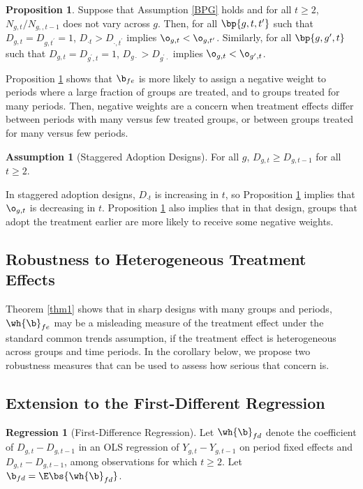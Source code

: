 \documentclass[12pt]{article}
\theoremstyle{definition}
\newtheorem{assumption}{Assumption}
\newtheorem{regression}{Regression}
\newtheorem{proposition}{Proposition}
\begin{document}
\begin{proposition}
    \label{prop1}
    Suppose that Assumption \ref{BPG} holds and for all $t \geq 2$, $N_{g,t}/N_{g,,t-1}$ does not vary across $g$. Then, for all $\bp{g, t, t^\prime}$ such that $D_{g,t} = D_{g, t^\prime} = 1$, $D_{\cdot t} > D_{\cdot, t^{\prime}}$ implies $\o_{g,t} < \o_{g, t^{\prime}}$. Similarly, for all $\bp{g, g^{\prime}, t}$ such that $D_{g,t} = D_{g^{\prime}, t} = 1$, $D_{g\cdot} > D_{g^{\prime} \cdot}$ implies $\o_{g,t} < \o_{g^{\prime}, t}$.
\end{proposition}

Proposition \ref{prop1} shows that $\b_{fe}$ is more likely to assign a negative weight to periods where a large fraction of groups are treated, and to groups treated for many periods. Then, negative weights are a concern when treatment effects differ between periods with many versus few treated groups, or between groups treated for many versus few periods. 

\begin{assumption}[Staggered Adoption Designs] \label{SAD}
    For all $g$, $D_{g,t} \geq D_{g, t-1}$ for all $t \geq 2$.
\end{assumption}

In staggered adoption designs, $D_{\cdot t}$ is increasing in $t$, so Proposition \ref{prop1} implies that $\o_{g,t}$ is decreasing in $t$. Proposition \ref{prop1} also implies that in that design, groups that adopt the treatment earlier are more likely to receive some negative weights.

\subsection{Robustness to Heterogeneous Treatment Effects}

Theorem \ref{thm1} shows that in sharp designs with many groups and periods, $\wh{\b}_{fe}$ may be a misleading measure of the treatment effect under the standard common trends assumption, if the treatment effect is heterogeneous across groups and time periods. In the corollary below, we propose two robustness measures that can be used to assess how serious that concern is. 

\subsection{Extension to the First-Different Regression}

\begin{regression}[First-Difference Regression]
    Let $\wh{\b}_{fd}$ denote the coefficient of $D_{g,t} - D_{g,t-1}$ in an OLS regression of $Y_{g,t} - Y_{g,t-1}$ on period fixed effects and $D_{g,t} - D_{g, t-1}$, among observations for which $t \geq 2$. Let $\b_{fd} = \E\bs{\wh{\b}_{fd}}$.
\end{regression}
\end{document}

